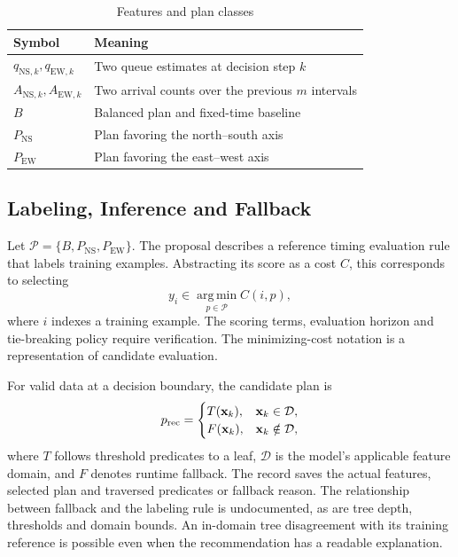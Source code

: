 \begin{table}[t]
\caption{Features and plan classes}
\label{tab:features}\centering\footnotesize
\begin{tabular}{@{}L{.32\columnwidth}L{.63\columnwidth}@{}}
\toprule Symbol & Meaning\\ \midrule
$q_{\mathrm{NS},k},q_{\mathrm{EW},k}$ & Two queue estimates at decision step $k$\\
$A_{\mathrm{NS},k},A_{\mathrm{EW},k}$ & Two arrival counts over the previous $m$ intervals\\
$B$ & Balanced plan and fixed-time baseline\\
$P_{\mathrm{NS}}$ & Plan favoring the north--south axis\\
$P_{\mathrm{EW}}$ & Plan favoring the east--west axis\\
\bottomrule
\end{tabular}
\end{table}

\subsection{Labeling, Inference and Fallback}
Let $\mathcal P=\{B,P_{\mathrm{NS}},P_{\mathrm{EW}}\}$. The proposal describes a reference timing evaluation rule that labels training examples. Abstracting its score as a cost $C$, this corresponds to selecting
\begin{equation}
y_i\in\operatorname*{arg\,min}_{p\in\mathcal P}C(i,p),
\label{eq:label}
\end{equation}
where $i$ indexes a training example. The scoring terms, evaluation horizon and tie-breaking policy require verification. The minimizing-cost notation is a representation of candidate evaluation.

For valid data at a decision boundary, the candidate plan is
\begin{equation}
 p_{\rm rec}=
 \begin{cases}
 T(\mathbf{x}_k), & \mathbf{x}_k\in\mathcal D,\\
 F(\mathbf{x}_k), & \mathbf{x}_k\notin\mathcal D ,
 \end{cases}
\label{eq:selection}
\end{equation}
where $T$ follows threshold predicates to a leaf, $\mathcal D$ is the model's applicable feature domain, and $F$ denotes runtime fallback. The record saves the actual features, selected plan and traversed predicates or fallback reason. The relationship between fallback and the labeling rule is undocumented, as are tree depth, thresholds and domain bounds. An in-domain tree disagreement with its training reference is possible even when the recommendation has a readable explanation.

